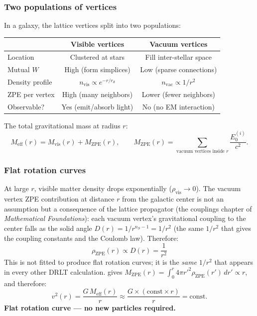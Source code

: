 \subsubsection{Two populations of vertices}

In a galaxy, the lattice vertices split into two populations:

\begin{center}
\begin{tabular}{lcc}
\hline
& Visible vertices & Vacuum vertices \\
\hline
Location & Clustered at stars & Fill inter-stellar space \\
Mutual $W$ & High (form simplices) & Low (sparse connections) \\
Density profile & $n_\text{vis} \propto e^{-r/r_d}$ & $n_\text{vac} \propto 1/r^2$ \\
ZPE per vertex & High (many neighbors) & Lower (fewer neighbors) \\
Observable? & Yes (emit/absorb light) & No (no EM interaction) \\
\hline
\end{tabular}
\end{center}

The total gravitational mass at radius $r$:
\begin{equation}
M_\text{eff}(r) = M_\text{vis}(r) + M_\text{ZPE}(r), \qquad M_\text{ZPE}(r) = \sum_{\text{vacuum vertices inside } r} \frac{E_0^{(i)}}{c^2}.
\end{equation}

\subsubsection{Flat rotation curves}

At large $r$, visible matter density drops exponentially ($\rho_\text{vis} \to 0$). The vacuum vertex ZPE contribution at distance $r$ from the galactic center is not an assumption but a consequence of the lattice propagator (the couplings chapter of \textit{Mathematical Foundations}): each vacuum vertex's gravitational coupling to the center falls as the solid angle $D(r) = 1/r^{n_S - 1} = 1/r^2$ (the same $1/r^2$ that gives the coupling constants and the Coulomb law). Therefore:
\begin{equation}
\rho_\text{ZPE}(r) \propto D(r) = \frac{1}{r^2}
\end{equation}
This is not fitted to produce flat rotation curves; it is the \emph{same} $1/r^2$ that appears in every other DRLT calculation.
gives $M_\text{ZPE}(r) = \int_0^r 4\pi r'^2 \rho_\text{ZPE}(r')\,dr' \propto r$, and therefore:
\begin{equation}
v^2(r) = \frac{G\,M_\text{eff}(r)}{r} \approx \frac{G \times (\text{const}\times r)}{r} = \text{const}.
\end{equation}
\textbf{Flat rotation curve --- no new particles required.}

